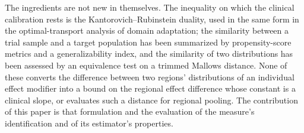 \documentclass[AMA,Times1COL]{WileyNJDv5}
\begin{document}
The ingredients are not new in themselves. The inequality on which the clinical calibration rests is the Kantorovich--Rubinstein duality, used in the same form in the optimal-transport analysis of domain adaptation;\cite{shen2018} the similarity between a trial sample and a target population has been summarized by propensity-score metrics\cite{stuart2011} and a generalizability index,\cite{tipton2014} and the similarity of two distributions has been assessed by an equivalence test on a trimmed Mallows distance.\cite{munk1998} None of these converts the difference between two regions' distributions of an individual effect modifier into a bound on the regional effect difference whose constant is a clinical slope, or evaluates such a distance for regional pooling. The contribution of this paper is that formulation and the evaluation of the measure's identification and of its estimator's properties.

\end{document}
